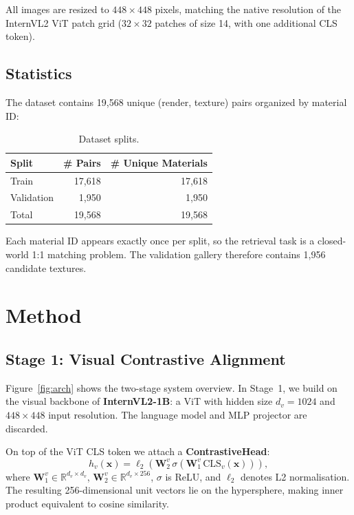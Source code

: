 \documentclass[10pt,twocolumn]{article}
\begin{document}
All images are resized to $448 \times 448$ pixels, matching the native
resolution of the InternVL2 ViT patch grid ($32 \times 32$ patches of size
14, with one additional CLS token).

\subsection{Statistics}

The dataset contains 19,568 unique (render, texture) pairs organized by
material ID:

\begin{table}[h]
\centering
\caption{Dataset splits.}
\label{tab:dataset}
\begin{tabular}{lrr}
\toprule
Split & \# Pairs & \# Unique Materials \\
\midrule
Train & 17{,}618 & 17{,}618 \\
Validation & 1{,}950 & 1{,}950 \\
\midrule
Total & 19{,}568 & 19{,}568 \\
\bottomrule
\end{tabular}
\end{table}

Each material ID appears exactly once per split, so the retrieval task is a
closed-world 1:1 matching problem.
The validation gallery therefore contains 1,956 candidate textures.

\section{Method}

\subsection{Stage 1: Visual Contrastive Alignment}
\label{sec:stage1}

Figure~\ref{fig:arch} shows the two-stage system overview.
In Stage~1, we build on the visual backbone of \textbf{InternVL2-1B}:
a ViT with hidden size $d_v = 1024$ and $448\!\times\!448$ input resolution.
The language model and MLP projector are discarded.

On top of the ViT CLS token we attach a \textbf{ContrastiveHead}:
\begin{equation}
  h_v(\mathbf{x}) = \ell_2\!\!\left(\mathbf{W}_2^v\,\sigma(\mathbf{W}_1^v\,\text{CLS}_v(\mathbf{x}))\right),
  \label{eq:head}
\end{equation}
where $\mathbf{W}_1^v \in \mathbb{R}^{d_v \times d_v}$,
$\mathbf{W}_2^v \in \mathbb{R}^{d_v \times 256}$, $\sigma$ is ReLU,
and $\ell_2$ denotes L2 normalisation.
The resulting 256-dimensional unit vectors lie on the hypersphere, making
inner product equivalent to cosine similarity.
\end{document}
